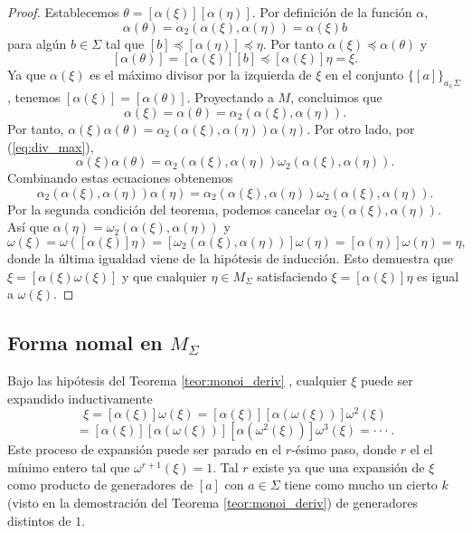 \documentclass[12pt]{book}
\theoremstyle{definition}
\begin{document}
\begin{proof}
Establecemos $\theta=[\alpha(\xi)][\alpha(\eta)]$. Por definición de la función $\alpha$,
$$\alpha(\theta)=\alpha_2(\alpha(\xi),\alpha(\eta))=\alpha(\xi)b$$
para algún $b\in\Sigma$ tal que $[b]\preceq [\alpha(\eta)]\preceq\eta$. Por tanto $\alpha(\xi)\preceq\alpha(\theta)$ y 
$$[\alpha(\theta)] = [\alpha(\xi)][b]\preceq[\alpha(\xi)]\eta=\xi.$$
Ya que $\alpha(\xi)$ es el máximo divisor por la izquierda de $\xi$ en el conjunto $\{[a]\}_{a_\in\Sigma}$, tenemos $[\alpha(\xi)]=[\alpha(\theta)]$. Proyectando a $M$, concluimos que
$$\alpha(\xi)=\alpha(\theta) = \alpha_2(\alpha(\xi),\alpha(\eta)).$$
Por tanto, $\alpha(\xi)\alpha(\theta)=\alpha_2(\alpha(\xi),\alpha(\eta))\alpha(\eta)$. Por otro lado, por (\ref{eq:div_max}),
$$\alpha(\xi)\alpha(\theta)=\alpha_2(\alpha(\xi),\alpha(\eta))\omega_2(\alpha(\xi),\alpha(\eta)).$$
Combinando estas ecuaciones obtenemos
$$\alpha_2(\alpha(\xi),\alpha(\eta))\alpha(\eta) = \alpha_2(\alpha(\xi),\alpha(\eta))\omega_2(\alpha(\xi),\alpha(\eta)).$$
Por la segunda condición del teorema, podemos cancelar $\alpha_2(\alpha(\xi),\alpha(\eta))$. Así que $\alpha(\eta) = \omega_2(\alpha(\xi),\alpha(\eta))$ y 
$$\omega(\xi) = \omega([\alpha(\xi)]\eta) = [\omega_2(\alpha(\xi),\alpha(\eta))]\omega(\eta)=[\alpha(\eta)]\omega(\eta) = \eta,$$
donde la última igualdad viene de la hipótesis de inducción. Esto demuestra que $\xi = [\alpha(\xi)\omega(\xi)]$ y que cualquier $\eta\in M_\Sigma$ satisfaciendo $\xi = [\alpha(\xi)]\eta$ es igual a $\omega(\xi)$.
\end{proof}








\subsection{Forma nomal en $M_\Sigma$}
\label{sec:fn_msigma}
Bajo las hipótesis del Teorema \ref{teor:monoi_deriv} , cualquier $\xi$ puede ser expandido inductivamente
$$\xi=[\alpha(\xi)]\omega(\xi)=[\alpha(\xi)][\alpha(\omega(\xi))]\omega^2(\xi)$$
$$=[\alpha(\xi)][\alpha(\omega(\xi))][\alpha(\omega^2(\xi))]\omega^3(\xi)=\cdot\cdot\cdot\ .$$
Este proceso de expansión puede ser parado en el $r$-ésimo paso, donde $r$ el el mínimo entero tal que $\omega^{r+1}(\xi)=1$. Tal $r$ existe ya que una expansión de $\xi$ como producto de  generadores de $[a]$ con $a\in\Sigma$ tiene como mucho un cierto $k$ (visto en la demostración del Teorema \ref{teor:monoi_deriv}) de generadores distintos de $1$.
\end{document}
